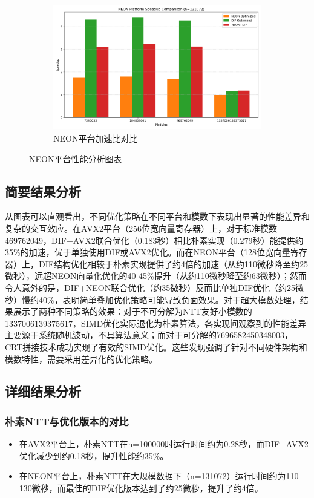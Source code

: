 \documentclass[a4paper,colorlinks=true,linkcolor=blue,urlcolor=blue,citecolor=green,bookmarks=true]{article}
\begin{document}
\begin{figure}[H]
\begin{subfigure}[b]{0.32\textwidth}
    \includegraphics[width=\textwidth]{neon_speedup_comparison.png}
    \caption{NEON平台加速比对比}
    \label{fig:neon_speedup}
  \end{subfigure}
  \caption{NEON平台性能分析图表}
  \label{fig:neon_performance}
\end{figure}

\subsection{简要结果分析}

从图表可以直观看出，不同优化策略在不同平台和模数下表现出显著的性能差异和复杂的交互效应。在AVX2平台（256位宽向量寄存器）上，对于标准模数469762049，DIF+AVX2联合优化（0.183秒）相比朴素实现（0.279秒）能提供约35\%的加速，优于单独使用DIF或AVX2优化。而在NEON平台（128位宽向量寄存器）上，DIF结构优化相较于朴素实现提供了约4倍的加速（从约110微秒降至约25微秒），远超NEON向量化优化的40-45\%提升（从约110微秒降至约63微秒）；然而令人意外的是，DIF+NEON联合优化（约35微秒）反而比单独DIF优化（约25微秒）慢约40\%，表明简单叠加优化策略可能导致负面效果。对于超大模数处理，结果展示了两种不同策略的效果：对于不可分解为NTT友好小模数的1337006139375617，SIMD优化实际退化为朴素算法，各实现间观察到的性能差异主要源于系统随机波动，不具算法意义；而对于可分解的7696582450348003，CRT拼接技术成功实现了有效的SIMD优化。这些发现强调了针对不同硬件架构和模数特性，需要采用差异化的优化策略。

\subsection{详细结果分析}

\subsubsection{朴素NTT与优化版本的对比}
\begin{itemize}
  \item 在AVX2平台上，朴素NTT在n=100000时运行时间约为0.28秒，而DIF+AVX2优化减少到约0.18秒，提升性能约35\%。
  \item 在NEON平台上，朴素NTT在大规模数据下（n=131072）运行时间约为110-130微秒，而最佳的DIF优化版本达到了约25微秒，提升了约4倍。
\end{itemize}
\end{document}
